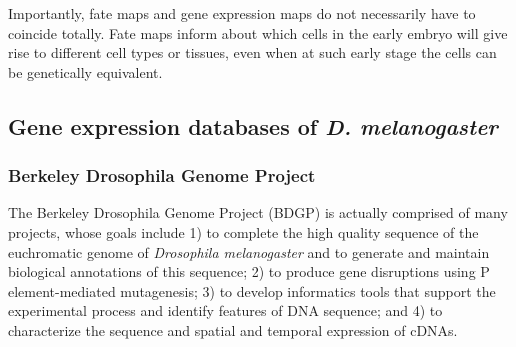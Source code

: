 \begin{mdframed}[style=boxstyle,frametitle={Box1. Fate maps and gene expression maps }]

Importantly, fate maps and gene expression maps do not necessarily have to coincide totally. Fate maps inform about which cells in the early embryo will give rise to different cell types or tissues, even when at such early stage the cells can be genetically equivalent.

\end{mdframed}


\subsection{Gene expression databases of \textit{D. melanogaster}}
\label{Intro_BDGP}

\subsubsection{Berkeley Drosophila Genome Project}

The Berkeley Drosophila Genome Project (BDGP) is actually comprised of many projects, whose goals include 1) to complete the high quality sequence of the euchromatic genome of \textit{Drosophila melanogaster} and to generate and maintain biological annotations of this sequence; 2) to produce gene disruptions using P element-mediated mutagenesis; 3) to develop informatics tools that support the experimental process and identify features of DNA sequence; and 4) to characterize the sequence and spatial and temporal expression of cDNAs.

